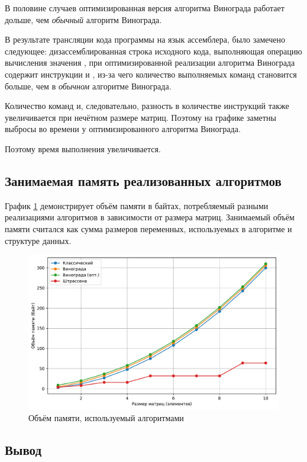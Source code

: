 В половине случаев оптимизированная версия алгоритма Винограда работает дольше, чем \textit{обычный} алгоритм Винограда.

В результате трансляции кода программы на язык ассемблера, было замечено следующее: дизассемблированная строка исходного кода, выполняющая операцию вычисления значения , при оптимизированной реализации алгоритма Винограда содержит инструкции  и , из-за чего количество выполняемых команд становится больше, чем в \textit{обычном} алгоритме Винограда.

Количество команд и, следовательно, разность в количестве инструкций также увеличивается при нечётном размере матриц.
Поэтому на графике заметны выбросы во времени у оптимизированного алгоритма Винограда.

Поэтому время выполнения увеличивается.

\newpage

\subsection{Занимаемая память реализованных алгоритмов}
 
График \ref{fig:memory} демонстрирует объём памяти в байтах, потребляемый разными реализациями алгоритмов в зависимости от размера матриц.
Занимаемый объём памяти считался как сумма размеров переменных, используемых в алгоритме и структуре данных.

\begin{figure}
	\centering
	\includegraphics[width=0.9\linewidth]{../src/lab_02/memory}
	\caption{Объём памяти, используемый алгоритмами}
	\label{fig:memory}
\end{figure}


\subsection{Вывод}

